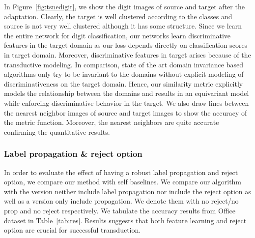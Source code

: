 In Figure~\ref{fig:tsnedigit}, we show the digit images of source and target after the adaptation. Clearly, the target is well clustered according to the classes and source is not very well clustered although it has some structure. Since we learn the entire network for digit classification, our networks learn discriminative features in the target domain as our loss depends directly on classification scores in target domain. Moreover, discriminative features in target arises because of the transductive modeling. In comparison, state of the art domain invariance based algorithms only try to be invariant to the domains without explicit modeling of discriminativeness on the target domain. Hence, our similarity metric explicitly models the relationship between the domains and results in an equivariant model while enforcing discriminative behavior in the target. We also draw lines between the nearest neighbor images of source and target images to show the accuracy of the metric function. Moreover, the nearest neighbors are quite accurate confirming the quantitative results. 

\subsubsection{Label propagation \& reject option}
In order to evaluate the effect of having a robust label propagation and reject option, we compare our method with self baselines. We compare our algorithm with the version neither include label propagation nor include the reject option as well as a version only include propagation. We denote them with no reject/no prop and no reject respectively. We tabulate the accuracy results from Office dataset in Table~\ref{tab:res}. Results suggests that both feature learning and reject option are crucial for successful transduction. 



